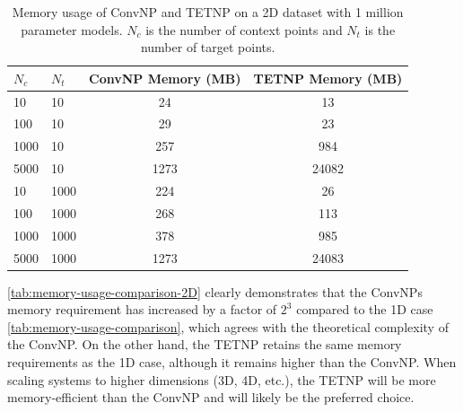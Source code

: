 \documentclass[../../main.tex]{subfiles}
\begin{document}
\begin{table}[H]
    \centering
    \begin{tabular}{@{}llcc@{}}
    \toprule
    $N_c$ & $N_t$ & ConvNP Memory (MB) & TETNP Memory (MB) \\ \midrule
    10    & 10    & 24                 & 13                \\
    100   & 10    & 29                 & 23                \\
    1000  & 10    & 257                & 984               \\
    5000  & 10    & 1273               & 24082             \\ \midrule
    10    & 1000  & 224                & 26                \\
    100   & 1000  & 268                & 113               \\
    1000  & 1000  & 378                & 985               \\
    5000  & 1000  & 1273               & 24083             \\ \bottomrule
    \end{tabular}
    \caption{Memory usage of ConvNP and TETNP on a 2D dataset with 1 million parameter models. $N_c$ is the number of context points and $N_t$ is the number of target points.}
    \label{tab:memory-usage-comparison-2D}
    \end{table}
\FloatBarrier

\autoref{tab:memory-usage-comparison-2D} clearly demonstrates that the ConvNPs memory requirement has increased by a factor of $2^3$ compared to the 1D case \autoref{tab:memory-usage-comparison}, which agrees with the theoretical complexity of the ConvNP. On the other hand, the TETNP retains the same memory requirements as the 1D case, although it remains higher than the ConvNP. When scaling systems to higher dimensions (3D, 4D, etc.), the TETNP will be more memory-efficient than the ConvNP and will likely be the preferred choice.



\ifSubfilesClassLoaded{%
    \printbibliography{}
}{} 
\end{document}
